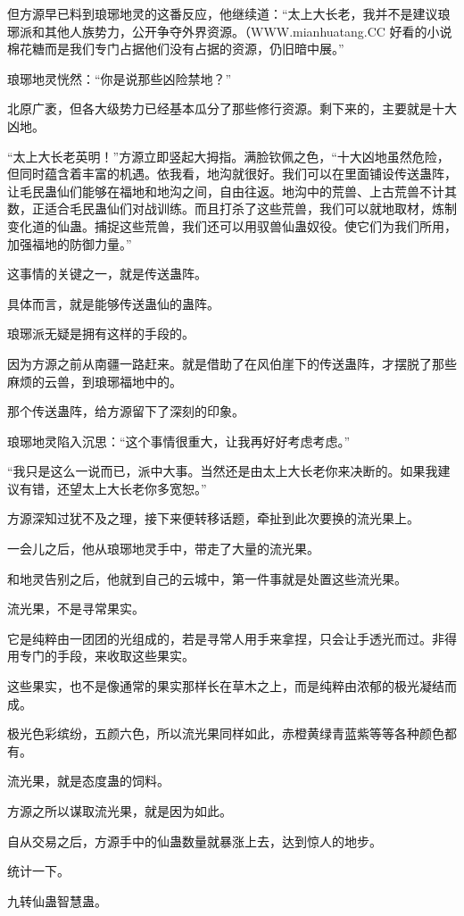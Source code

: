 \begin{this_body}
但方源早已料到琅琊地灵的这番反应，他继续道：“太上大长老，我并不是建议琅琊派和其他人族势力，公开争夺外界资源。（WWW.mianhuatang.CC 好看的小说棉花糖而是我们专门占据他们没有占据的资源，仍旧暗中展。”

琅琊地灵恍然：“你是说那些凶险禁地？”

北原广袤，但各大级势力已经基本瓜分了那些修行资源。剩下来的，主要就是十大凶地。

“太上大长老英明！”方源立即竖起大拇指。满脸钦佩之色，“十大凶地虽然危险，但同时蕴含着丰富的机遇。依我看，地沟就很好。我们可以在里面铺设传送蛊阵，让毛民蛊仙们能够在福地和地沟之间，自由往返。地沟中的荒兽、上古荒兽不计其数，正适合毛民蛊仙们对战训练。而且打杀了这些荒兽，我们可以就地取材，炼制变化道的仙蛊。捕捉这些荒兽，我们还可以用驭兽仙蛊奴役。使它们为我们所用，加强福地的防御力量。”

这事情的关键之一，就是传送蛊阵。

具体而言，就是能够传送蛊仙的蛊阵。

琅琊派无疑是拥有这样的手段的。

因为方源之前从南疆一路赶来。就是借助了在风伯崖下的传送蛊阵，才摆脱了那些麻烦的云兽，到琅琊福地中的。

那个传送蛊阵，给方源留下了深刻的印象。

琅琊地灵陷入沉思：“这个事情很重大，让我再好好考虑考虑。”

“我只是这么一说而已，派中大事。当然还是由太上大长老你来决断的。如果我建议有错，还望太上大长老你多宽恕。”

方源深知过犹不及之理，接下来便转移话题，牵扯到此次要换的流光果上。

一会儿之后，他从琅琊地灵手中，带走了大量的流光果。

和地灵告别之后，他就到自己的云城中，第一件事就是处置这些流光果。

流光果，不是寻常果实。

它是纯粹由一团团的光组成的，若是寻常人用手来拿捏，只会让手透光而过。非得用专门的手段，来收取这些果实。

这些果实，也不是像通常的果实那样长在草木之上，而是纯粹由浓郁的极光凝结而成。

极光色彩缤纷，五颜六色，所以流光果同样如此，赤橙黄绿青蓝紫等等各种颜色都有。

流光果，就是态度蛊的饲料。

方源之所以谋取流光果，就是因为如此。

自从交易之后，方源手中的仙蛊数量就暴涨上去，达到惊人的地步。

统计一下。

九转仙蛊智慧蛊。


\end{this_body}
